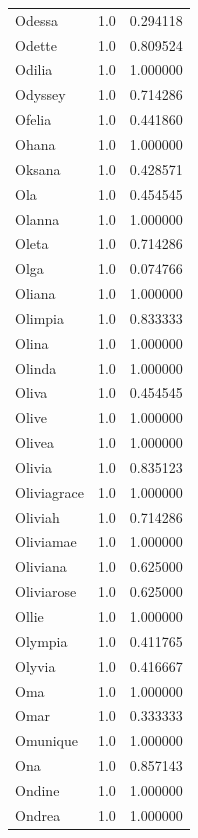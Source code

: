 \documentclass[
  letterpaper,
  DIV=11,
  numbers=noendperiod]{scrreprt}
\begin{document}
\begin{tabular}{lrr}
Odessa          &   1.0 &   0.294118 \\
Odette          &   1.0 &   0.809524 \\
Odilia          &   1.0 &   1.000000 \\
Odyssey         &   1.0 &   0.714286 \\
Ofelia          &   1.0 &   0.441860 \\
Ohana           &   1.0 &   1.000000 \\
Oksana          &   1.0 &   0.428571 \\
Ola             &   1.0 &   0.454545 \\
Olanna          &   1.0 &   1.000000 \\
Oleta           &   1.0 &   0.714286 \\
Olga            &   1.0 &   0.074766 \\
Oliana          &   1.0 &   1.000000 \\
Olimpia         &   1.0 &   0.833333 \\
Olina           &   1.0 &   1.000000 \\
Olinda          &   1.0 &   1.000000 \\
Oliva           &   1.0 &   0.454545 \\
Olive           &   1.0 &   1.000000 \\
Olivea          &   1.0 &   1.000000 \\
Olivia          &   1.0 &   0.835123 \\
Oliviagrace     &   1.0 &   1.000000 \\
Oliviah         &   1.0 &   0.714286 \\
Oliviamae       &   1.0 &   1.000000 \\
Oliviana        &   1.0 &   0.625000 \\
Oliviarose      &   1.0 &   0.625000 \\
Ollie           &   1.0 &   1.000000 \\
Olympia         &   1.0 &   0.411765 \\
Olyvia          &   1.0 &   0.416667 \\
Oma             &   1.0 &   1.000000 \\
Omar            &   1.0 &   0.333333 \\
Omunique        &   1.0 &   1.000000 \\
Ona             &   1.0 &   0.857143 \\
Ondine          &   1.0 &   1.000000 \\
Ondrea          &   1.0 &   1.000000 \\

\end{tabular}
\end{document}
